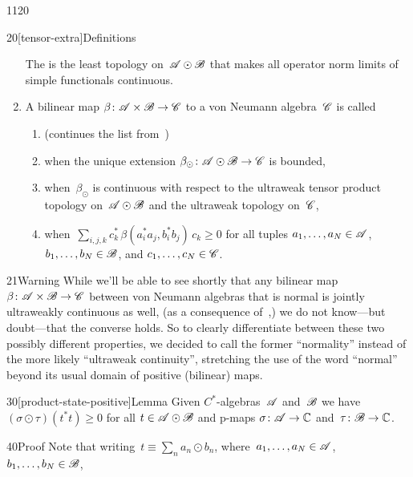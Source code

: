 \begin{parsec}{1120}
\begin{point}{20}[tensor-extra]{Definitions}
\begin{enumerate}
The %
is the least topology on~$\mathscr{A}\odot\mathscr{B}$
that makes all operator norm limits
of simple functionals continuous.
\item
A bilinear map $\beta\colon \mathscr{A}\times \mathscr{B}\to\mathscr{C}$
to a von Neumann algebra~$\mathscr{C}$
is called
\begin{enumerate}
\item
(continues the list from~)
\item
{}%
when the unique extension $\beta_\odot \colon \mathscr{A}\odot \mathscr{B}\to \mathscr{C}$
is bounded,
\item 
{}%
%
when~$\beta_\odot$
is continuous with respect to the ultraweak tensor product topology 
on~$\mathscr{A}\odot\mathscr{B}$
and the ultraweak topology on~$\mathscr{C}$,
\item
{}%
%
%
when~$\sum_{i,j,k}c_k^*\,\beta(a_i^*a_j,b_i^*b_j)\,c_k\geq 0$
for all tuples $a_1,\dotsc,a_N\in\mathscr{A}$,
$b_1,\dotsc,b_N\in\mathscr{B}$,
and $c_1,\dotsc,c_N\in\mathscr{C}$.
\end{enumerate}
\end{enumerate}
\spacingfix%
\begin{point}{21}{Warning}%
While we'll be able to see shortly that any bilinear map
$\beta\colon \mathscr{A}\times\mathscr{B}\to\mathscr{C}$
between von Neumann algebras
that is normal
is jointly ultraweakly continuous as well,
(as a consequence of~,)
we do not know---but doubt---that the converse holds.
So to clearly differentiate between these two possibly different properties,
we decided to call the former ``normality'' instead of 
    the more likely ``ultraweak continuity'',
stretching the use of the word ``normal'' beyond its usual 
    domain of positive (bilinear) maps.
\end{point}
\end{point}
\begin{point}{30}[product-state-positive]{Lemma}%
Given $C^*$-algebras~$\mathscr{A}$ and~$\mathscr{B}$
we have~$(\sigma\odot \tau) (t^*t)\geq 0$
for all  $t\in\mathscr{A}\odot\mathscr{B}$
and p-maps  $\sigma\colon \mathscr{A}\to\mathbb{C}$
and~$\tau\colon \mathscr{B}\to\mathbb{C}$.
\begin{point}{40}{Proof}%
Note that writing~$t\equiv \sum_n a_n \odot b_n$,
where~$a_1,\dotsc,a_N\in \mathscr{A}$, $b_1,\dotsc,b_N\in \mathscr{B}$,

\end{point}
\end{point}
\end{parsec}
